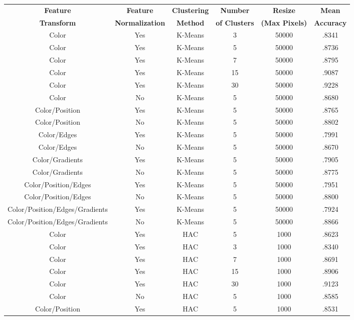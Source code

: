 \documentclass[12pt]{article}
\begin{document}
\begin{table}[H]
	\begin{adjustbox}{width=\columnwidth,center}
		\begin{tabular}{c c c c c c}
			\hline
			\textbf{Feature} & \textbf{Feature} & \textbf{Clustering} & \textbf{Number} & \textbf{Resize} & \textbf{Mean} \\
			\textbf{Transform} & \textbf{Normalization} & \textbf{Method} & \textbf{of Clusters} & \textbf{(Max Pixels)} & \textbf{Accuracy} \\
			\hline
			Color & Yes & K-Means & 3 & 50000 & .8341 \\
			Color & Yes & K-Means & 5 & 50000 & .8736 \\
			Color & Yes & K-Means & 7 & 50000 & .8795 \\
			Color & Yes & K-Means & 15 & 50000 & .9087 \\
			Color & Yes & K-Means & 30 & 50000 & .9228 \\
			Color & No  & K-Means & 5 & 50000 & .8680 \\
			Color/Position & Yes & K-Means & 5 & 50000 & .8765 \\
			Color/Position & No & K-Means & 5 & 50000 & .8802 \\
			Color/Edges & Yes & K-Means & 5 & 50000 & .7991\\
			Color/Edges & No & K-Means & 5 & 50000 & .8670 \\
			Color/Gradients & Yes & K-Means & 5 & 50000 & .7905 \\
			Color/Gradients & No & K-Means & 5 & 50000 & .8775 \\
			Color/Position/Edges & Yes & K-Means & 5 & 50000 & .7951 \\
			Color/Position/Edges & No & K-Means & 5 & 50000 & .8800 \\
			Color/Position/Edges/Gradients & Yes & K-Means & 5 & 50000 & .7924 \\
			Color/Position/Edges/Gradients & No & K-Means & 5 & 50000 & .8866 \\
			Color & Yes & HAC & 5 & 1000 & .8623 \\
			Color & Yes & HAC & 3 & 1000 & .8340 \\
			Color & Yes & HAC & 7 & 1000 & .8691 \\
			Color & Yes & HAC & 15 & 1000 & .8906 \\
			Color & Yes & HAC & 30 & 1000 & .9123 \\
			Color & No & HAC & 5 & 1000 & .8585 \\
			Color/Position & Yes & HAC & 5 & 1000 & .8531 \\

\end{tabular}
\end{adjustbox}
\end{table}
\end{document}
